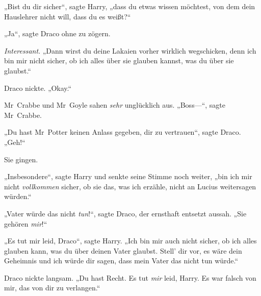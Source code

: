 „Bist du dir sicher“, sagte Harry, „dass du etwas wissen möchtest, von dem dein Hauslehrer nicht will, dass du es weißt?“

„Ja“, sagte Draco ohne zu zögern.

\emph{Interessant}. „Dann wirst du deine Lakaien vorher wirklich wegschicken, denn ich bin mir nicht sicher, ob ich alles über sie glauben kannst, was du über sie glaubst.“

Draco nickte. „Okay.“

Mr~Crabbe und Mr~Goyle sahen \emph{sehr} unglücklich aus. „Boss—“, sagte Mr~Crabbe.

„Du hast Mr~Potter keinen Anlass gegeben, dir zu vertrauen“, sagte Draco. „Geh!“

Sie gingen.

„Insbesondere“, sagte Harry und senkte seine Stimme noch weiter, „bin ich mir nicht \emph{vollkommen} sicher, ob sie das, was ich erzähle, nicht an Lucius weitersagen würden.“

„Vater würde das nicht \emph{tun}!“, sagte Draco, der ernsthaft entsetzt aussah. „Sie gehören \emph{mir}!“

„Es tut mir leid, Draco“, sagte Harry. „Ich bin mir auch nicht sicher, ob ich alles glauben kann, was du über deinen Vater glaubst. Stell’ dir vor, es wäre dein Geheimnis und ich würde dir sagen, dass mein Vater das nicht tun würde.“

Draco nickte langsam. „Du hast Recht. Es tut \emph{mir} leid, Harry. Es war falsch von mir, das von dir zu verlangen.“

